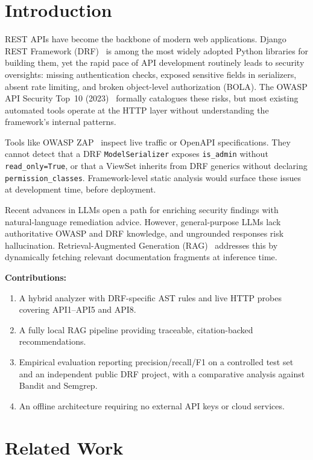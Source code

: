 \documentclass[conference]{IEEEtran}
\begin{document}
\section{Introduction}

REST APIs have become the backbone of modern web applications. Django REST
Framework (DRF)~\cite{drf} is among the most widely adopted Python libraries
for building them, yet the rapid pace of API development routinely leads to
security oversights: missing authentication checks, exposed sensitive fields in
serializers, absent rate limiting, and broken object-level authorization
(BOLA). The OWASP API Security Top~10 (2023)~\cite{owaspapisec} formally
catalogues these risks, but most existing automated tools operate at the HTTP
layer without understanding the framework's internal patterns.

Tools like OWASP ZAP~\cite{owaspzap} inspect live traffic or OpenAPI
specifications. They cannot detect that a DRF \texttt{ModelSerializer} exposes
\texttt{is\_admin} without \texttt{read\_only=True}, or that a ViewSet inherits
from DRF generics without declaring \texttt{permission\_classes}. Framework-level
static analysis would surface these issues at development time, before
deployment.

Recent advances in LLMs open a path for enriching security findings with
natural-language remediation advice. However, general-purpose LLMs lack
authoritative OWASP and DRF knowledge, and ungrounded responses risk
hallucination. Retrieval-Augmented Generation (RAG)~\cite{rag2020} addresses
this by dynamically fetching relevant documentation fragments at inference time.

\textbf{Contributions:}
\begin{enumerate}
\item A hybrid analyzer with DRF-specific AST rules and live HTTP probes covering API1--API5 and API8.
\item A fully local RAG pipeline providing traceable, citation-backed recommendations.
\item Empirical evaluation reporting precision/recall/F1 on a controlled test set and an independent public DRF project, with a comparative analysis against Bandit and Semgrep.
\item An offline architecture requiring no external API keys or cloud services.
\end{enumerate}

\section{Related Work}
\end{document}
